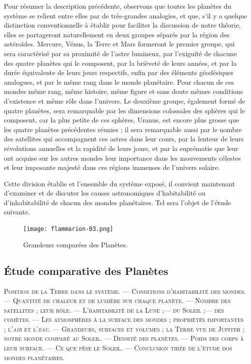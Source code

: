 \documentclass[a4paper, 11pt, oneside]{article}
\begin{document}
Pour résumer la description précédente, observons que toutes les planètes du système se relient entre elles par de très-grandes analogies, et que, s'il y a quelque distinction conventionnelle à établir pour faciliter la discussion de notre théorie, elles se partageront naturellement en deux groupes séparés par la région des astéroïdes. Mercure, Vénus, la Terre et Mars formeront le premier groupe, qui sera caractérisé par sa proximité de l'astre lumineux, par l'exiguïté de chacune des quatre planètes qui le composent, par la brièveté de leurs années, et par la durée équivalente de leurs jours respectifs, enfin par des éléments géodésiques analogues, et par le même rang dans le monde planétaire. Pour chacun de ces mondes même rang, même histoire, même figure et sans doute mêmes conditions d'existence et même rôle dans l'univers. Le deuxième groupe, également formé de quatre planètes, sera remarquable par les dimensions colossales des sphères qui le composent, car la plus petite de ces sphères, Uranus, est encore plus grosse que les quatre planètes précédentes réunies ; il sera remarquable aussi par le nombre des satellites qui accompagnent ces astres dans leur cours, par la lenteur de leurs révolutions annuelles et la rapidité de leurs jours, et par la suprématie que leur ont acquise sur les autres mondes leur importance dans les mouvements célestes et leur imposante majesté dans ces régions immenses de l'univers solaire.

Cette division établie et l'ensemble du système exposé, il convient maintenant d'examiner et de discuter les causes astronomiques d'habitabilité ou d'inhabitabilité de chacun des mondes planétaires. Tel sera l'objet de l'étude suivante.
\clearpage
\vspace*{\fill}
\begin{figure}[H]
\centering
\texttt{[image: flammarion-03.png]}
\caption{\Fontauri Grandeurs comparées des Planètes.}
\end{figure}
\vspace*{\fill}
\clearpage
\subsection{Étude comparative des Planètes}
\begin{center}
\scshape
\small
Position de la Terre dans le système. --- Conditions d'habitabilité des mondes. --- Quantité de chaleur et de lumière sur chaque planète. --- Nombre des satellites ; leur rôle. --- L'habitabilité de la Lune ;--- du Soleil ;--- des comètes. --- Les atmosphères à la surface des mondes ; propriétés importantes ; l'\emph{air} et l'\emph{eau}. --- Grandeurs, surfaces et volumes ; la Terre vue de Jupiter ; notre monde comparé au Soleil. --- Densité des planètes. --- Poids des corps à leur surface. --- Ce que pèse le Soleil. --- Conclusion tirée de l'étude dos mondes planétaires.
\end{center}
\end{document}
